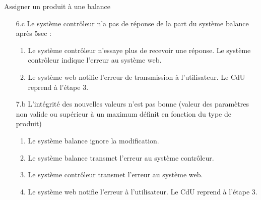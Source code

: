 \begin{UseCase}{Assigner un produit à une balance}
\begin{UseCaseExtension}
\begin{enumerate}
        \item[6.c] Le système contrôleur n'a pas de réponse de la part du système balance après 5sec :
            \begin{enumerate}
                \item Le système contrôleur n'essaye plus de recevoir une réponse.
                    Le système contrôleur indique l'erreur au système web.
                \item Le système web notifie l'erreur de transmission à l'utilisateur. Le CdU reprend à l'étape 3.
            \end{enumerate}

        \item[7.b] L'intégrité des nouvelles valeurs n'est pas bonne (valeur des paramètres non valide ou supérieur à un maximum définit en fonction du type de produit)
            \begin{enumerate}
                \item Le système balance ignore la modification.
                \item Le système balance transmet l'erreur au système contrôleur.
                \item Le système contrôleur transmet l'erreur au système web.
                \item Le système web notifie l'erreur à l'utilisateur. Le CdU reprend à l'étape 3.
            \end{enumerate}
        \end{enumerate}
    \end{UseCaseExtension}
\end{UseCase}
